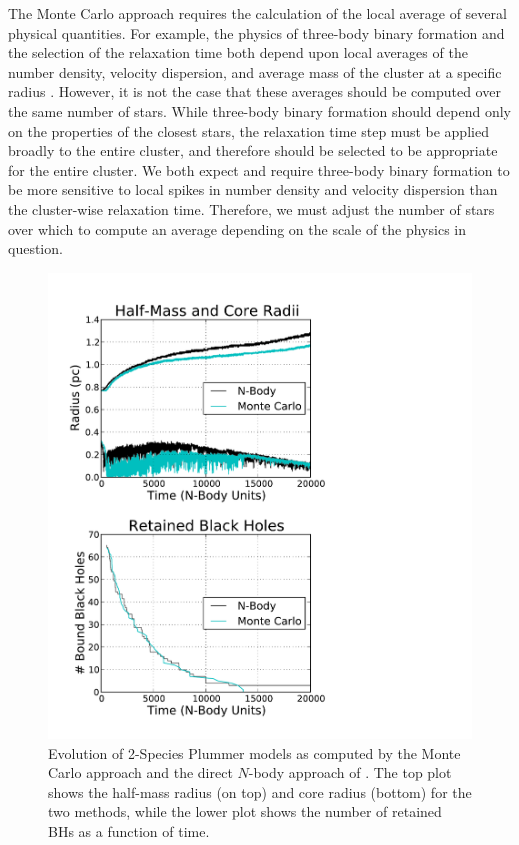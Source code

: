 \documentclass[12pt,preprint]{aastex}
\begin{document}
The Monte Carlo approach requires the calculation of the local average of several
physical quantities.  For example, the physics of three-body binary formation and the
selection of the relaxation time both depend upon
local averages of the number density, velocity dispersion, and average mass of
the cluster at a specific radius \citep{Joshi2000}.
However, it is not the case that these averages should be computed over the same
number of stars.   While three-body binary formation should depend only on the
properties of the closest stars, the relaxation time step must be applied broadly to
 the entire cluster, and therefore should be selected to be appropriate for the entire cluster.
 We both expect and require three-body binary
formation to be more sensitive to local spikes in number density and velocity
dispersion than the cluster-wise relaxation time.  Therefore, we must adjust the
number of stars over which to compute an average depending on the scale of the
physics in question.

\begin{figure}[h!]
  \includegraphics[scale=0.65]{64.pdf}
  \caption{Evolution of 2-Species Plummer models as computed by the Monte Carlo
  approach and the direct $N$-body approach of \cite{Breen2013}.  The
  top plot shows the half-mass radius (on top) and core radius (bottom) for the
  two methods, while the lower plot shows the number of retained BHs as
  a function of time.}
  \label{fig:2species64k}
\end{figure}
\end{document}
